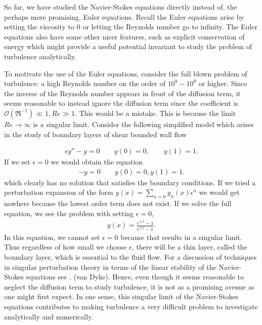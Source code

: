 So far, we have studied the Navier-Stokes equations directly instead of, the perhaps more promising, Euler equations. Recall the Euler equations arise by setting the viscosity to $0$ or letting the Reynolds number go to infinity. The Euler equations also have some other nicer features, such as explicit conservation of energy which might provide a useful potential invariant to study the problem of turbulence analytically. 

To motivate the use of the Euler equations, consider the full blown problem of turbulence: a high Reynolds number on the order of $10^{8}-10^{9}$ or higher. Since the inverse of the Reynolds number appears in front of the diffusion term, it seems reasonable to instead ignore the diffusion term since the coefficient is $\mathcal{O}(\Re^{-1}) \ll 1, Re\gg 1$. This would be a mistake. This is because the limit $Re\rightarrow\infty$ is a singular limit. Consider the following simplified model which arises in the study of boundary layers of shear bounded wall flow\cite{benderorszag,acheson_fluid,kundu}

\begin{align}
\epsilon y'' - y =0 \qquad y(0)=0,\qquad y(1)=1.
\end{align}
If we set $\epsilon=0$ we would obtain the equation 
\begin{align}
- y =0 \qquad y(0)=0,y(1)=1.
\end{align}
which clearly has no solution that satisfies the boundary conditions. If we tried a perturbation expansion of the form $y(x) =\sum_{n=0}y_{n}(x)\epsilon^{n}$ we would get nowhere because the lowest order term does not exist. If we solve the full equation, we see the problem with setting $\epsilon=0$,
\begin{align}
y(x) = \frac{e^{x/\epsilon}-1}{e^{1/\epsilon}-1}.
\end{align}
In this equation, we cannot set $\epsilon=0$ because that results in a singular limit. Thus regardless of how small we choose $\epsilon$, there will be a thin layer, called the boundary layer, which is essential to the fluid flow. For a discussion of techniques in singular perturbation theory in terms of the linear stability of the Navier-Stokes equations see \cite{drazinreid}. (van Dyke). Hence, even though it seems reasonable to neglect the diffusion term to study turbulence, it is not as a promising avenue as one might first expect. In one sense, this singular limit of the Navier-Stokes equations contributes to making turbulence a very difficult problem to investigate analytically and numerically. 


